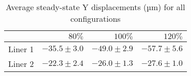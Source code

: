 \begin{table}[htbp!]
\centering
\begin{tabular}{lrrr}
\toprule
  & $80\%$ & $100\%$ & $120\%$ \\
\midrule
 Liner 1 & $-35.5 \pm 3.0$ & $-49.0 \pm 2.9$ & $-57.7 \pm 5.6$ \\
 Liner 2 & $-22.3 \pm 2.4$ & $-26.0 \pm 1.3$ & $-27.6 \pm 1.0$ \\
\bottomrule
\end{tabular}
\caption{Average steady-state Y displacements (µm) for all configurations}
\label{fig:avg_results_table}
\end{table}